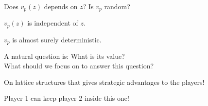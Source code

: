 \documentclass[11pt, mathserif]{beamer}
\begin{document}


    \begin{frame}{Does $v_p(z)$ depends on $z$? Is $v_p$ random?}
        \begin{theorem}\label{theorem-vz-independent-z-game1}
            $v_p(z)$ is independent of $z$. 
        \end{theorem}
        \begin{theorem}\label{theorem-vz-independent-z-game1}
            $v_p$ is almost surely deterministic. 
        \end{theorem}
        \vspace{0.5cm}
        \pause

        A natural question is: What is its value? \\ 
        \pause
        \vspace{0.2cm}
        What should we focus on to answer this question? \\ \pause 

        On lattice structures that gives strategic advantages to the players!
    \end{frame}

    \begin{frame}{Player 1 can keep player 2 inside this one!}
        \vspace{0.3cm}
         
    \end{frame}
\end{document}
